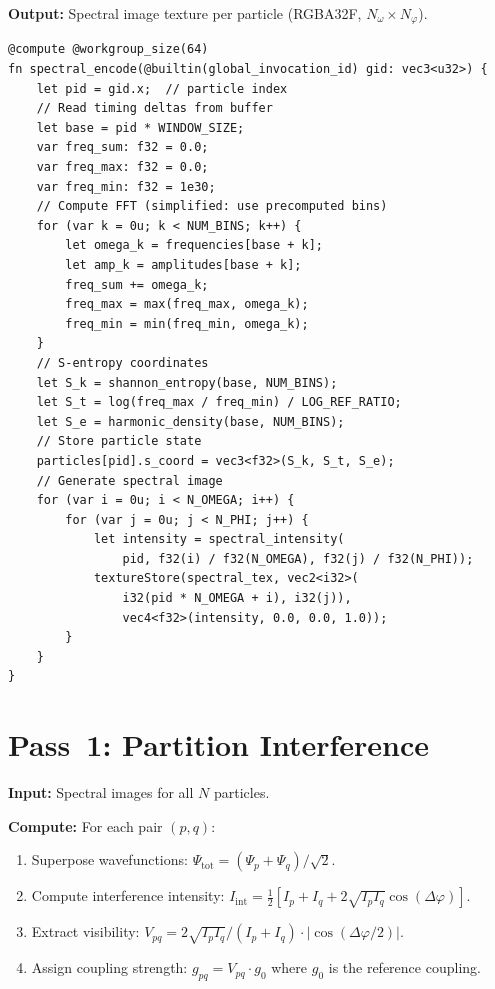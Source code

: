 \documentclass[twocolumn,10pt,a4paper]{article}
\theoremstyle{plain}
\theoremstyle{definition}
\theoremstyle{remark}
\begin{document}
\textbf{Output:} Spectral image texture per particle (RGBA32F, $N_\omega \times N_\varphi$).

\begin{lstlisting}[style=wgsl,caption={Pass 0: Spectral Encoding (WGSL pseudocode)}]
@compute @workgroup_size(64)
fn spectral_encode(@builtin(global_invocation_id) gid: vec3<u32>) {
    let pid = gid.x;  // particle index
    // Read timing deltas from buffer
    let base = pid * WINDOW_SIZE;
    var freq_sum: f32 = 0.0;
    var freq_max: f32 = 0.0;
    var freq_min: f32 = 1e30;
    // Compute FFT (simplified: use precomputed bins)
    for (var k = 0u; k < NUM_BINS; k++) {
        let omega_k = frequencies[base + k];
        let amp_k = amplitudes[base + k];
        freq_sum += omega_k;
        freq_max = max(freq_max, omega_k);
        freq_min = min(freq_min, omega_k);
    }
    // S-entropy coordinates
    let S_k = shannon_entropy(base, NUM_BINS);
    let S_t = log(freq_max / freq_min) / LOG_REF_RATIO;
    let S_e = harmonic_density(base, NUM_BINS);
    // Store particle state
    particles[pid].s_coord = vec3<f32>(S_k, S_t, S_e);
    // Generate spectral image
    for (var i = 0u; i < N_OMEGA; i++) {
        for (var j = 0u; j < N_PHI; j++) {
            let intensity = spectral_intensity(
                pid, f32(i) / f32(N_OMEGA), f32(j) / f32(N_PHI));
            textureStore(spectral_tex, vec2<i32>(
                i32(pid * N_OMEGA + i), i32(j)),
                vec4<f32>(intensity, 0.0, 0.0, 1.0));
        }
    }
}
\end{lstlisting}

\section{Pass~1: Partition Interference}
\label{sec:pass1}

\textbf{Input:} Spectral images for all $N$ particles.

\textbf{Compute:} For each pair $(p, q)$:
\begin{enumerate}
    \item Superpose wavefunctions: $\Psi_{\mathrm{tot}} = (\Psi_p + \Psi_q)/\sqrt{2}$.
    \item Compute interference intensity: $I_{\mathrm{int}} = \tfrac{1}{2}[I_p + I_q + 2\sqrt{I_p I_q}\cos(\Delta\varphi)]$.
    \item Extract visibility: $V_{pq} = 2\sqrt{I_p I_q}/(I_p + I_q) \cdot |\cos(\Delta\varphi/2)|$.
    \item Assign coupling strength: $g_{pq} = V_{pq} \cdot g_0$ where $g_0$ is the reference coupling.
\end{enumerate}
\end{document}
